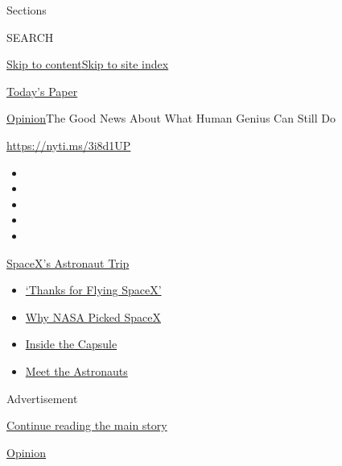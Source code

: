 Sections

SEARCH

\protect\hyperlink{site-content}{Skip to
content}\protect\hyperlink{site-index}{Skip to site index}

\href{https://myaccount.nytimes.com/auth/login?response_type=cookie\&client_id=vi}{}

\href{https://www.nytimes.com/section/todayspaper}{Today's Paper}

\href{/section/opinion}{Opinion}\textbar{}The Good News About What Human
Genius Can Still Do

\url{https://nyti.ms/3i8d1UP}

\begin{itemize}
\item
\item
\item
\item
\item
\end{itemize}

\href{https://www.nytimes.com/2020/08/02/science/spacex-astronauts-splashdown.html?action=click\&pgtype=Article\&state=default\&region=TOP_BANNER\&context=storylines_menu}{SpaceX's
Astronaut Trip}

\begin{itemize}
\tightlist
\item
  \href{https://www.nytimes.com/2020/08/02/science/spacex-astronauts-splashdown.html?action=click\&pgtype=Article\&state=default\&region=TOP_BANNER\&context=storylines_menu}{`Thanks
  for Flying SpaceX'}
\item
  \href{https://www.nytimes.com/2020/05/26/science/spacex-launch-nasa.html?action=click\&pgtype=Article\&state=default\&region=TOP_BANNER\&context=storylines_menu}{Why
  NASA Picked SpaceX}
\item
  \href{https://www.nytimes.com/interactive/2020/05/26/science/spacex-nasa.html?action=click\&pgtype=Article\&state=default\&region=TOP_BANNER\&context=storylines_menu}{Inside
  the Capsule}
\item
  \href{https://www.nytimes.com/2020/05/27/science/bob-behnken-doug-hurley.html?action=click\&pgtype=Article\&state=default\&region=TOP_BANNER\&context=storylines_menu}{Meet
  the Astronauts}
\end{itemize}

Advertisement

\protect\hyperlink{after-top}{Continue reading the main story}

\href{/section/opinion}{Opinion}

